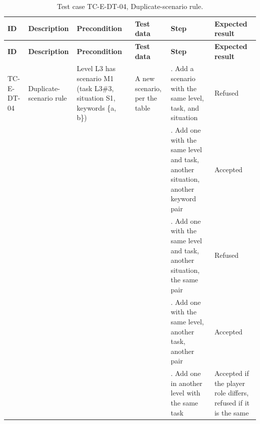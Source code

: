 {\footnotesize{}\renewcommand{\arraystretch}{1.1}
\begin{longtable}{|>{\raggedright\arraybackslash}p{}|>{\raggedright\arraybackslash}p{}|>{\raggedright\arraybackslash}p{}|>{\raggedright\arraybackslash}p{}|>{\raggedright\arraybackslash}p{}|>{\raggedright\arraybackslash}p{}|}
\caption{Test case TC-E-DT-04, Duplicate-\allowbreak{}scenario rule.} \\
\hline
\textbf{ID} & \textbf{Description} & \textbf{Precondition} & \textbf{Test data} & \textbf{Step} & \textbf{Expected result} \\ \hline
\endfirsthead
\hline
\textbf{ID} & \textbf{Description} & \textbf{Precondition} & \textbf{Test data} & \textbf{Step} & \textbf{Expected result} \\ \hline
\endhead
TC-E-DT-04 & Duplicate-\allowbreak{}scenario rule & Level L3 has scenario M1 (task L3\#3, situation S1, keywords \{a, b\}) & A new scenario, per the table & 1. Add a scenario with the same level, task, and situation & Refused \\ \cline{5-6}
 &  &  &  & 2. Add one with the same level and task, another situation, another keyword pair & Accepted \\ \cline{5-6}
 &  &  &  & 3. Add one with the same level and task, another situation, the same pair & Refused \\ \cline{5-6}
 &  &  &  & 4. Add one with the same level, another task, another pair & Accepted \\ \cline{5-6}
 &  &  &  & 5. Add one in another level with the same task & Accepted if the player role differs, refused if it is the same \\ \hline
\end{longtable}
}

